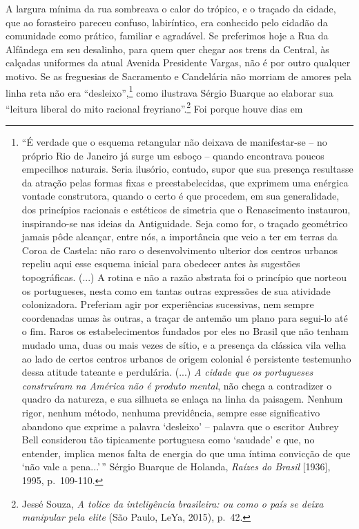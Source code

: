 A largura mínima da rua sombreava o calor do trópico, e o traçado da
cidade, que ao forasteiro pareceu confuso, labiríntico, era conhecido
pelo cidadão da comunidade como prático, familiar e agradável. Se
preferimos hoje a Rua da Alfândega em seu desalinho, para quem quer
chegar aos trens da Central, às calçadas uniformes da atual Avenida
Presidente Vargas, não é por outro qualquer motivo. Se as freguesias de
Sacramento e Candelária não morriam de amores pela linha reta não era
``desleixo'',\footnote{``É verdade que o esquema retangular não deixava
  de manifestar-se -- no próprio Rio de Janeiro já surge um esboço --
  quando encontrava poucos empecilhos naturais. Seria ilusório, contudo,
  supor que sua presença resultasse da atração pelas formas fixas e
  preestabelecidas, que exprimem uma enérgica vontade construtora,
  quando o certo é que procedem, em sua generalidade, dos princípios
  racionais e estéticos de simetria que o Renascimento instaurou,
  inspirando-se nas ideias da Antiguidade. Seja como for, o traçado
  geométrico jamais pôde alcançar, entre nós, a importância que veio a
  ter em terras da Coroa de Castela: não raro o desenvolvimento ulterior
  dos centros urbanos repeliu aqui esse esquema inicial para obedecer
  antes às sugestões topográficas. (...) A rotina e não a razão abstrata
  foi o princípio que norteou os portugueses, nesta como em tantas
  outras expressões de sua atividade colonizadora. Preferiam agir por
  experiências sucessivas, nem sempre coordenadas umas às outras, a
  traçar de antemão um plano para segui-lo até o fim. Raros os
  estabelecimentos fundados por eles no Brasil que não tenham mudado
  uma, duas ou mais vezes de sítio, e a presença da clássica vila velha
  ao lado de certos centros urbanos de origem colonial é persistente
  testemunho dessa atitude tateante e perdulária. (...) \emph{A cidade
  que os portugueses construíram na América não é produto mental}, não
  chega a contradizer o quadro da natureza, e sua silhueta se enlaça na
  linha da paisagem. Nenhum rigor, nenhum método, nenhuma previdência,
  sempre esse significativo abandono que exprime a palavra `desleixo' --
  palavra que o escritor Aubrey Bell considerou tão tipicamente
  portuguesa como `saudade' e que, no entender, implica menos falta de
  energia do que uma íntima convicção de que `não vale a pena...'\,''
  Sérgio Buarque de Holanda, \emph{Raízes do Brasil} {[}1936{]}, 1995,
  p.~109-110.} como ilustrava Sérgio Buarque ao elaborar sua ``leitura
liberal do mito racional freyriano''.\footnote{Jessé Souza, \emph{A
  tolice da inteligência brasileira: ou como o país se deixa manipular
  pela elite} (São Paulo, LeYa, 2015), p.~42.} Foi porque houve dias em
